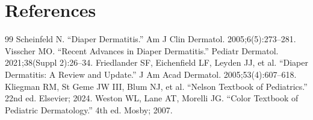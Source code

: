 \section*{References}
\begin{thebibliography}{99}
 Scheinfeld N. ``Diaper Dermatitis.'' Am J Clin Dermatol. 2005;6(5):273--281.
 Visscher MO. ``Recent Advances in Diaper Dermatitis.'' Pediatr Dermatol. 2021;38(Suppl 2):26--34.
 Friedlander SF, Eichenfield LF, Leyden JJ, et al. ``Diaper Dermatitis: A Review and Update.'' J Am Acad Dermatol. 2005;53(4):607--618.
 Kliegman RM, St Geme JW III, Blum NJ, et al. ``Nelson Textbook of Pediatrics.'' 22nd ed. Elsevier; 2024.
 Weston WL, Lane AT, Morelli JG. ``Color Textbook of Pediatric Dermatology.'' 4th ed. Mosby; 2007.
\end{thebibliography}
